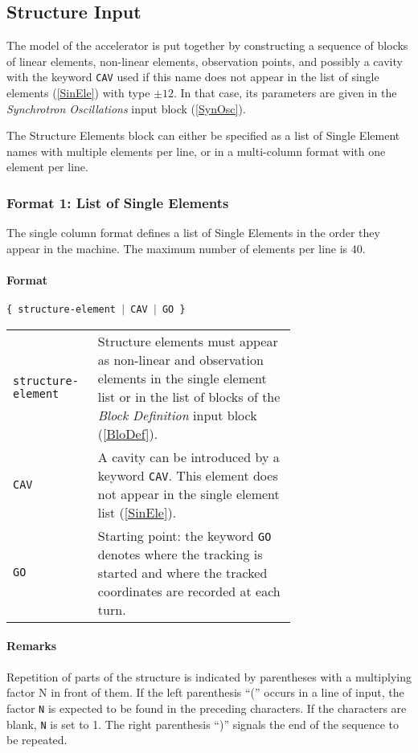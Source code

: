 \subsection{Structure Input} \label{StrInp}

The model of the accelerator is put together by constructing a sequence of blocks of linear elements, non-linear elements, observation points, and possibly a cavity with the keyword \texttt{CAV} used if this name does not appear in the list of single elements (\ref{SinEle}) with type $\pm 12$.
In that case, its parameters are given in the \textit{Synchrotron Oscillations} input block (\ref{SynOsc}).

The Structure Elements block can either be specified as a list of Single Element names with multiple elements per line, or in a multi-column format with one element per line.

\subsubsection{Format 1: List of Single Elements}

The single column format defines a list of Single Elements in the order they appear in the machine.
The maximum number of elements per line is 40.

\paragraph{Format} \texttt{\{ structure-element $\vert$ CAV $\vert$ GO \}}

\bigskip
\begin{longtabu}{@{}lp{0.70\linewidth}}
    \texttt{structure-element} & Structure elements must appear as non-linear and observation elements in the single element list or in the list of blocks of the \textit{Block Definition} input block (\ref{BloDef}). \\
    \texttt{CAV} & A cavity can be introduced by a keyword \texttt{CAV}. This element does not appear in the single element list   (\ref{SinEle}). \\
    \texttt{GO} & Starting point: the keyword \texttt{GO} denotes where the tracking is started and where the tracked coordinates are recorded at each turn.
\end{longtabu}

\paragraph{Remarks}
Repetition of parts of the structure is indicated by parentheses with a multiplying factor N in front of them.
If the left parenthesis ``('' occurs in a line of input, the factor \texttt{N} is expected to be found in the preceding characters.
If the characters are blank, \texttt{N} is set to 1.
The right parenthesis ``)'' signals the end of the sequence to be repeated.

